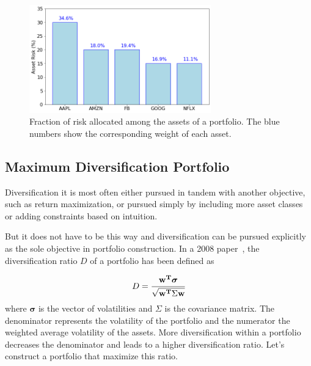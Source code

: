 \begin{figure}[htb]
	\centering
	\includegraphics[width=0.7\textwidth]{figures/risk_allocation}
	\caption{Fraction of risk allocated among the assets of a portfolio. The blue numbers show the corresponding weight of each asset.}
	\label{fig:risk_allocation}
\end{figure}

\subsection{Maximum Diversification Portfolio}
\label{maximum-diversification-portfolio}

Diversification it is most often either pursued in tandem with another objective, such as return maximization, or pursued simply by including more asset classes or adding constraints based on intuition.

But it does not have to be this way and diversification can be pursued explicitly as the sole objective in portfolio construction.
In a 2008 paper~\cite{bib:diversification}, the diversification ratio $D$ of a portfolio has been defined as

\begin{equation}
D=\cfrac{\mathbf{w^T}\boldsymbol{\sigma}}{\sqrt {\mathbf{w^T}\Sigma \mathbf{w}}} 
\end{equation}
where $\boldsymbol{\sigma}$ is the vector of volatilities and $\Sigma$ is the covariance matrix. The denominator represents the volatility of the portfolio and the numerator the weighted average volatility of the assets. More diversification within a portfolio decreases the denominator and leads to a higher diversification ratio.
Let's construct a portfolio that maximize this ratio.

